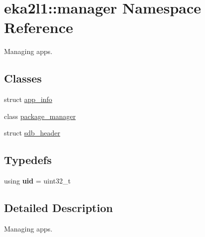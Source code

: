 \hypertarget{namespaceeka2l1_1_1manager}{}\section{eka2l1\+:\+:manager Namespace Reference}
\label{namespaceeka2l1_1_1manager}


Managing apps.  


\subsection*{Classes}
\begin{DoxyCompactItemize}
\item 
struct \mbox{\hyperlink{structeka2l1_1_1manager_1_1app__info}{app\+\_\+info}}
\item 
class \mbox{\hyperlink{classeka2l1_1_1manager_1_1package__manager}{package\+\_\+manager}}
\item 
struct \mbox{\hyperlink{structeka2l1_1_1manager_1_1sdb__header}{sdb\+\_\+header}}
\end{DoxyCompactItemize}
\subsection*{Typedefs}
\begin{DoxyCompactItemize}
\item 
\mbox{\label{namespaceeka2l1_1_1manager_acbe3460099ad00c27cf800391d7fc937}} 
using {\bfseries uid} = uint32\+\_\+t
\end{DoxyCompactItemize}


\subsection{Detailed Description}
Managing apps. 